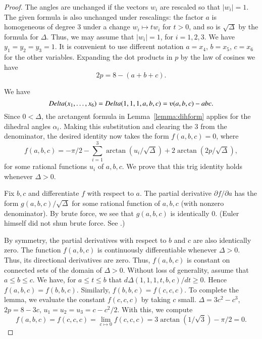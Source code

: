 \begin{proof}
The angles are unchanged if the vectors $w_i$ are rescaled so that
$|w_i|=1$.  The given formula is also unchanged under rescalings:
the factor $a$ is homogeneous of degree $3$ under a change $w_i
\mapsto t w_i$ for $t>0$, and so is $\sqrt{\Delta}$ by the
formula for $\Delta$.  Thus, we may assume that $|w_i|=1$, for
$i=1,2,3$. We have $y_1=y_2=y_3=1$.  It is convenient to use
different notation $a=x_4$, $b=x_5$, $c=x_6$ for the other
variables. Expanding the dot products in $p$ by the law of cosines
we have
    $$2 p = 8 - (a+b+c).$$

We have $$\Delta(x_1,\ldots,x_6) = \Delta(1,1,1,a,b,c) =
    \ups(a,b,c) - a b c.$$
Since $0 <\Delta$, the arctangent formula
in Lemma~\ref{lemma:dihform} 
applies for the dihedral angles $\alpha_i$. Making
this substitution and clearing the $3$ from the denominator, the
desired identity now takes the form $f(a,b,c)=0$, where
    $$
    f(a,b,c)= -\pi/2 - \sum_{i=1}^3\arctan(u_i/\sqrt{\Delta}) +
    2\arctan(2 p/\sqrt{\Delta}),
    $$
for some rational functions $u_i$ of $a,b,c$.  We prove that this
trig identity holds whenever $\Delta>0$.

Fix $b,c$ and differentiate $f$ with respect
to $a$.  The partial derivative $\partial f/\partial a$ has the form
$g(a,b,c)/\sqrt{\Delta}$ for some rational function of $a,b,c$ (with
nonzero denominator).  By brute force, we see that $g(a,b,c)$ is
identically $0$.  (Euler himself did not shun brute force.  See
\cite{Euler}.)

By symmetry, the partial derivatives with respect to $b$ and $c$ are
also identically zero.  The function $f(a,b,c)$  is continuously
differentiable whenever $\Delta>0$.  Thus, its directional
derivatives are zero.  Thus, $f(a,b,c)$ is constant on connected
sets of the domain of $\Delta>0$.  Without loss of generality,
assume that $a\le b\le c$.  We have, for $a\le t\le b$ that
$d\Delta(1,1,1,t,b,c)/dt\ge 0$. Hence $f(a,b,c)=f(b,b,c)$. 
Similarly,
 $f(b,b,c)=f(c,c,c)$. 
To complete the lemma, we evaluate the constant $f(c,c,c)$
by taking $c$ small.
$\Delta=3c^2-c^3$, $2p= 8-3c$,  $u_1=u_2=u_3 = c -c^2/2$. With this,
we compute
    $$f(a,b,c)= f(c,c,c) = \lim_{c\mapsto0} f(c,c,c) = 
    3 \arctan(1/\sqrt3)-\pi/2 =0.$$
\end{proof}







